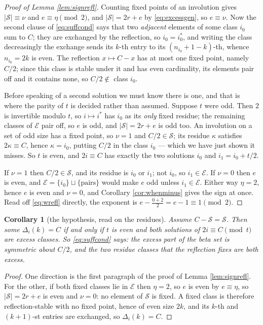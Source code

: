 \documentclass[11pt,reqno]{amsart}
\theoremstyle{plain}
\newtheorem{corollary}[theorem]{Corollary}
\theoremstyle{definition}
\begin{document}
\begin{proof}[Proof of Lemma \ref{lem:signrefl}]
Counting fixed points of an involution gives
$|\mathcal{S}|\equiv\nu$ and $e\equiv\eta \pmod 2$, and $|\mathcal{S}|=2r+e$ by
\eqref{eq:excessgen}, so $e\equiv\nu$. Now the second clause of \eqref{eq:suffcond} says that two
\emph{adjacent} elements of some class $i_0$ sum to $C$; they are exchanged by the reflection, so
$i_0=i_0^{*}$, and writing the class decreasingly the exchange sends its $k$-th entry to its
$(n_{i_0}+1-k)$-th, whence $n_{i_0}=2k$ is even. The reflection $x\mapsto C-x$ has at most one fixed
point, namely $C/2$; since this class is stable under it and has even cardinality, its elements pair
off and it contains none, so $C/2\notin$ class $i_0$.

Before speaking of a second solution we must know there is one, and that is where the parity of $t$
is decided rather than assumed. Suppose $t$ were odd. Then $2$ is invertible modulo $t$, so
$i\mapsto i^{*}$ has $i_0$ as its \emph{only} fixed residue; the remaining classes of $\mathcal{E}$
pair off, so $e$ is odd, and $|\mathcal{S}|=2r+e$ is odd too. An involution on a set of odd size has
a fixed point, so $\nu=1$ and $C/2\in\mathcal{S}$; its residue $\kappa$ satisfies $2\kappa\equiv C$,
hence $\kappa=i_0$, putting $C/2$ in the class $i_0$ --- which we have just shown it misses. So $t$
is even, and $2i\equiv C$ has exactly the two solutions $i_0$ and $i_1=i_0+t/2$.

If $\nu=1$ then
$C/2\in\mathcal{S}$, and its residue is $i_0$ or $i_1$; not $i_0$, so $i_1\in\mathcal{E}$. If $\nu=0$
then $e$ is even, and $\mathcal{E}=\{i_0\}\sqcup\{\text{pairs}\}$ would make $e$ odd unless
$i_1\in\mathcal{E}$. Either way $\eta=2$, hence $e$ is even and $\nu=0$, and Corollary
\ref{cor:whenminus} gives the sign at once. Read off \eqref{eq:wrefl} directly, the exponent is
$e-\tfrac{0+2}2=e-1\equiv1 \pmod 2$.
\end{proof}

\begin{corollary}[the hypothesis, read on the residues]\label{cor:suffgeom}
Assume $C-\mathcal{S}=\mathcal{S}$. Then some $\Delta_i(k)=C$ if and only if $t$ is even and
\emph{both} solutions of $2i\equiv C \pmod t$ are excess classes. So \eqref{eq:suffcond} says: the
excess part of the beta set is symmetric about $C/2$, and the two residue classes that the
reflection fixes are both excess.
\end{corollary}

\begin{proof}
One direction is the first paragraph of the proof of Lemma \ref{lem:signrefl}. For the other, if
both fixed classes lie in $\mathcal{E}$ then $\eta=2$, so $e$ is even by $e\equiv\eta$, so
$|\mathcal{S}|=2r+e$ is even and $\nu=0$: no element of $\mathcal{S}$ is fixed. A fixed class is
therefore reflection-stable with no fixed point, hence of even size $2k$, and its $k$-th and
$(k+1)$-st entries are exchanged, so $\Delta_i(k)=C$.
\end{proof}
\end{document}
